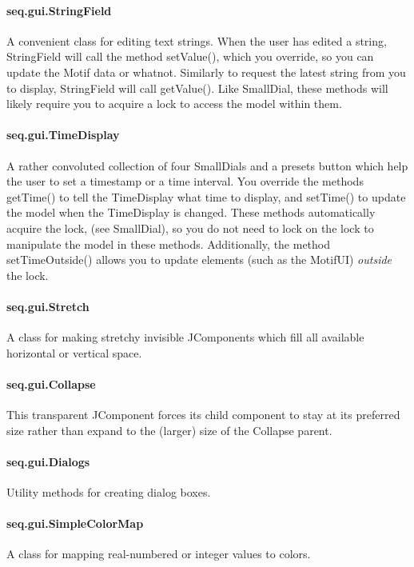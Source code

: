 \documentclass[twoside,10pt]{article}
\begin{document}
\paragraph{seq.gui.StringField}  A convenient class for editing text strings.  When the user has edited a string, StringField will call the method {\sf setValue()}, which you override, so you can update the Motif data or whatnot.  Similarly to request the latest string from you to display, StringField will call {\sf getValue()}.  Like SmallDial, these methods will likely require you to acquire a lock to access the model within them.

\paragraph{seq.gui.TimeDisplay}  A rather convoluted collection of four SmallDials and a presets button which help the user to set a timestamp or a time interval.  You override the methods {\sf getTime()} to tell the TimeDisplay what time to display, and {\sf setTime()} to update the model when the TimeDisplay is changed.  These methods automatically acquire the lock, (see SmallDial), so you do not need to lock on the lock to manipulate the model in these methods.  Additionally, the method {\sf setTimeOutside()} allows you to update elements (such as the MotifUI) {\it outside} the lock.

\paragraph{seq.gui.Stretch}  A class for making stretchy invisible JComponents which fill all available horizontal or vertical space.

\paragraph{seq.gui.Collapse}  This transparent JComponent forces its child component to stay at its preferred size rather than expand to the (larger) size of the Collapse parent.

\paragraph{seq.gui.Dialogs}  Utility methods for creating dialog boxes.

\paragraph{seq.gui.SimpleColorMap}  A class for mapping real-numbered or integer values to colors.
\end{document}

